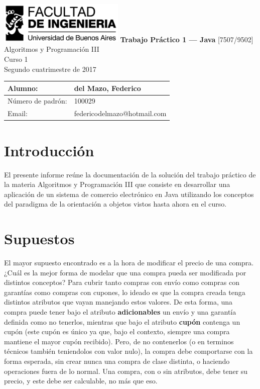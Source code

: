 \documentclass[titlepage,a4paper]{article}
\begin{document}
\begin{titlepage} %
	\hfill\includegraphics[width=6cm]{logofiuba.jpg}
    \centering
    \vfill
    \Huge \textbf{Trabajo Práctico 1 — Java}
    \vskip2cm
    \Large [7507/9502] Algoritmos y Programación III\\
    Curso 1 \\ %
    Segundo cuatrimestre de 2017 
    \vfill
    \begin{tabular}{ | l | l | } %
      \hline
      Alumno: & del Mazo, Federico \\ \hline
      Número de padrón: & 100029 \\ \hline
      Email: & federicodelmazo@hotmail.com \\ \hline
  	\end{tabular}
    \vfill
    \vfill
\end{titlepage}

\tableofcontents %
\newpage

\section{Introducción}\label{sec:intro}
El presente informe reúne la documentación de la solución del trabajo práctico de la materia Algoritmos y Programación III que consiste en desarrollar una aplicación de un sistema de comercio electrónico en Java utilizando los conceptos del paradigma de la orientación a objetos vistos hasta ahora en el curso.

\section{Supuestos}\label{sec:supuestos}

El mayor supuesto encontrado es a la hora de modificar el precio de una compra. ¿Cuál es la mejor forma de modelar que una compra pueda ser modificada por distintos conceptos? Para cubrir tanto compras con envío como compras con garantías como compras con cupones, lo ideado es que la compra creada tenga distintos atributos que vayan manejando estos valores. De esta forma, una compra puede tener bajo el atributo  \textbf{adicionables} un envío y una garantía definida como no tenerlos, mientras que bajo el atributo \textbf{cupón} contenga un cupón (este cupón es único ya que, bajo el contexto, siempre una compra mantiene el mayor cupón recibido). Pero, de no contenerlos (o en terminos técnicos también teniendolos con valor nulo), la compra debe comportarse con la forma esperada, sin crear nunca una compra de clase distinta, o haciendo operaciones fuera de lo normal. Una compra, con o sin atributos, debe tener su precio, y este debe ser calculable, no más que eso. 
\end{document}
